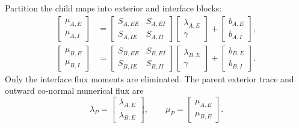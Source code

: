 \documentclass[11pt]{article}
\begin{document}
Partition the child maps into exterior and interface blocks:
\begin{align}\label{eq:full_child_blockA}
 \begin{bmatrix}\mu_{A,E}\\\mu_{A,I}\end{bmatrix}
 &=\begin{bmatrix}S_{A,EE}&S_{A,EI}\\S_{A,IE}&S_{A,II}\end{bmatrix}
 \begin{bmatrix}\lambda_{A,E}\\\gamma\end{bmatrix}
 +\begin{bmatrix}b_{A,E}\\b_{A,I}\end{bmatrix},\\
 \begin{bmatrix}\mu_{B,E}\\\mu_{B,I}\end{bmatrix}
 &=\begin{bmatrix}S_{B,EE}&S_{B,EI}\\S_{B,IE}&S_{B,II}\end{bmatrix}
 \begin{bmatrix}\lambda_{B,E}\\\gamma\end{bmatrix}
 +\begin{bmatrix}b_{B,E}\\b_{B,I}\end{bmatrix}.
 \label{eq:full_child_blockB}
\end{align}
Only the interface flux moments are eliminated.  The parent exterior
trace and outward co-normal numerical flux are
\begin{equation}\label{eq:full_parent_trace}
 \lambda_P=\begin{bmatrix}\lambda_{A,E}\\\lambda_{B,E}\end{bmatrix},
 \qquad
 \mu_P=\begin{bmatrix}\mu_{A,E}\\\mu_{B,E}\end{bmatrix}.
\end{equation}
\end{document}

